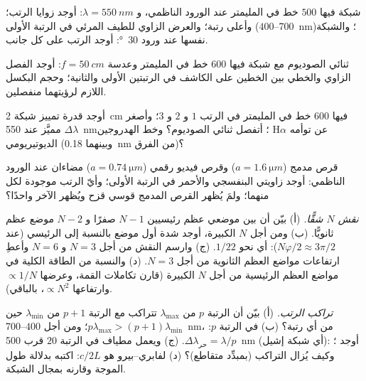 \begin{exercise}[$\star$]\label{exo:b2:gratings:1}
شبكة فيها $500$ خط في المليمتر عند الورود الناظمي، و $\lambda =
\qty{550}{nm}$: أوجد زوايا الرتب؛ وأعلى رتبة؛ والعرض الزاوي
للطيف المرئي في الرتبة الأولى ($400$--\qty{700}{nm})؛ والشبكة نفسها عند
ورود \qty{30}{\degree}: أوجد الرتب على كل جانب.
\end{exercise}

\begin{exercise}[$\star$]\label{exo:b2:gratings:2}
ثنائي الصوديوم مع شبكة فيها $600$ خط في المليمتر وعدسة $f =
\qty{50}{cm}$: أوجد الفصل الزاوي والخطي بين الخطين على
الكاشف في الرتبتين الأولى والثانية؛ وحجم البكسل اللازم لرؤيتهما
منفصلين.
\end{exercise}

\begin{exercise}[$\star$]\label{exo:b2:gratings:3}
أوجد قدرة تمييز شبكة \qty{2}{cm} فيها $600$ خط في المليمتر في الرتب $1$ و $2$
و $3$؛ وأصغر $\Delta\lambda$ مميَّز عند \qty{550}{nm}؛ أتفصل ثنائي
الصوديوم؟ وخط الهدروجين H$\alpha$ عن توأمه الديوتيريومي (وبينهما \qty{0.18}{nm}
من الفرق)؟
\end{exercise}

\begin{exercise}[$\star$]\label{exo:b2:gratings:4}
قرص مدمج ($a = \qty{1.6}{\micro m}$) وقرص فيديو رقمي ($a = \qty{0.74}{\micro m}$) مضاءان عند
الورود الناظمي: أوجد زاويتي البنفسجي والأحمر في الرتبة الأولى؛ وأيّ الرتب
موجودة لكل منهما؛ ولمَ يُظهر القرص المدمج قوسي قزح ويُظهر الآخر واحدًا؟
\end{exercise}

\begin{exercise}[$\star\star$]\label{exo:b2:gratings:5}
\emph{نقش $N$ شقًّا.} (أ) بيّن أن بين موضعي عظم رئيسيين
$N - 1$ صفرًا و $N - 2$ موضع عظم ثانويًّا. (ب) ومن أجل $N$ الكبيرة،
أوجد شدة أول موضع  بالنسبة إلى الرئيسي
(عند $N\varphi/2 \approx 3\pi/2$): أي نحو $1/22$. (ج) وارسم النقش من أجل
$N = 3$ و $N = 6$ وأعطِ ارتفاعات مواضع العظم الثانوية من أجل
$N = 3$. (د) والنسبة من الطاقة الكلية في مواضع العظم الرئيسية من أجل
$N$ الكبيرة (قارن تكاملات القمة، وعرضها $\propto 1/N$ وارتفاعها
$\propto N^2$، بالباقي).
\end{exercise}

\begin{exercise}[$\star\star$]\label{exo:b2:gratings:6}
\emph{تراكب الرتب.} (أ) بيّن أن الرتبة $p$ من $\lambda_{\max}$ تتراكب مع
الرتبة $p + 1$ من $\lambda_{\min}$ حين $p\lambda_{\max} > (p + 1)\lambda_{\min}$؛ ومن أجل $400$--\qty{700}{nm}، من أي رتبة؟ (ب)  في الرتبة $p$: $\Delta\lambda_{\text{حر}}
= \lambda/p$. (ج) ويعمل مطياف في الرتبة $20$ قرب \qty{500}{nm} (أي
شبكة إشيل): أوجد ؛ وكيف يُزال التراكب
(بمبدِّد متقاطع)؟ (د)  لفابري--بيرو هو $c/2L$:
اكتبه بدلالة طول الموجة وقارنه بمجال الشبكة.
\end{exercise}

